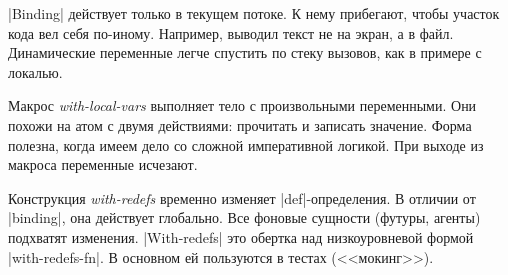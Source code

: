 \spverb|Binding| действует только в текущем потоке. К нему прибегают, чтобы
участок кода вел себя по-иному. Например, выводил текст не на экран, а в
файл. Динамические переменные легче спустить по стеку вызовов, как в примере с
локалью.

Макрос \emph{with-local-vars} выполняет тело с произвольными переменными. Они
похожи на атом с двумя действиями: прочитать и записать значение. Форма полезна,
когда имеем дело со сложной императивной логикой. При выходе из макроса
переменные исчезают.

Конструкция \emph{with-redefs} временно изменяет \spverb|def|-определения. В
отличии от \spverb|binding|, она действует глобально. Все фоновые сущности
(футуры, агенты) подхватят изменения. \spverb|With-redefs| это обертка над
низкоуровневой формой \spverb|with-redefs-fn|. В основном ей пользуются в тестах
(<<мокинг>>).
